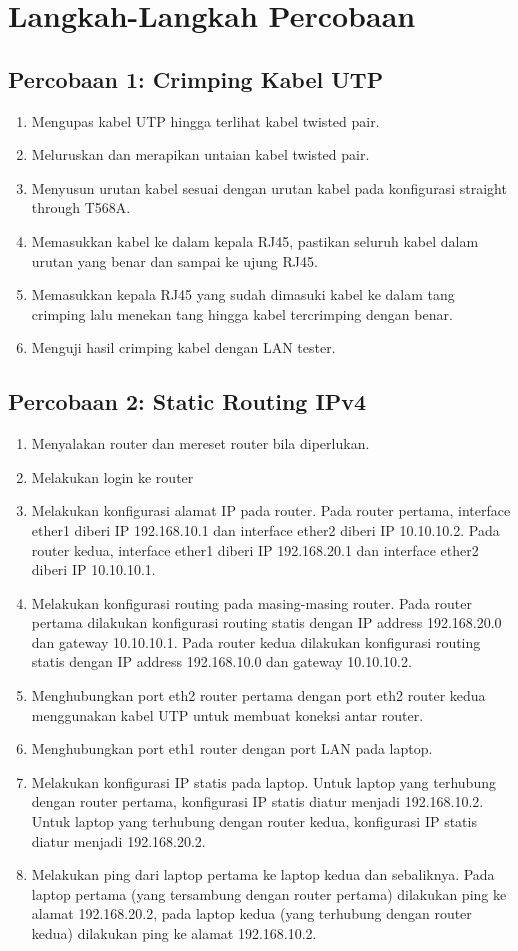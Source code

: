 \section{Langkah-Langkah Percobaan}
\subsection{Percobaan 1: Crimping Kabel UTP}
\begin{enumerate}
	\item Mengupas kabel UTP hingga terlihat kabel twisted pair.
	\item Meluruskan dan merapikan untaian kabel twisted pair. 
	\item Menyusun urutan kabel sesuai dengan urutan kabel pada konfigurasi straight through T568A.
	\item Memasukkan kabel ke dalam kepala RJ45, pastikan seluruh kabel dalam urutan yang benar dan sampai ke ujung RJ45.
	\item Memasukkan kepala RJ45 yang sudah dimasuki kabel ke dalam tang crimping lalu menekan tang hingga kabel tercrimping dengan benar.
	\item Menguji hasil crimping kabel dengan LAN tester.
\end{enumerate}
\subsection{Percobaan 2: Static Routing IPv4}
\begin{enumerate}
	\item Menyalakan router dan mereset router bila diperlukan.
	\item Melakukan login ke router
	\item Melakukan konfigurasi alamat IP pada router. Pada router pertama, interface ether1 diberi IP 192.168.10.1 dan interface ether2 diberi IP 10.10.10.2. Pada router kedua, interface ether1 diberi IP 192.168.20.1 dan interface ether2 diberi IP 10.10.10.1.
	\item Melakukan konfigurasi routing pada masing-masing router. Pada router pertama dilakukan konfigurasi routing statis dengan IP address 192.168.20.0 dan gateway 10.10.10.1. Pada router kedua dilakukan konfigurasi routing statis dengan IP address 192.168.10.0 dan gateway 10.10.10.2.
	\item Menghubungkan port eth2 router pertama dengan port eth2 router kedua menggunakan kabel UTP untuk membuat koneksi antar router.
	\item Menghubungkan port eth1 router dengan port LAN pada laptop.
	\item Melakukan konfigurasi IP statis pada laptop. Untuk laptop yang terhubung dengan router pertama, konfigurasi IP statis diatur menjadi 192.168.10.2. Untuk laptop yang terhubung dengan router kedua, konfigurasi IP statis diatur menjadi 192.168.20.2.
	\item Melakukan ping dari laptop pertama ke laptop kedua dan sebaliknya. Pada laptop pertama (yang tersambung dengan router pertama) dilakukan ping ke alamat 192.168.20.2, pada laptop kedua (yang terhubung dengan router kedua) dilakukan ping ke alamat 192.168.10.2.
\end{enumerate}
